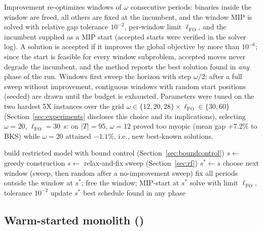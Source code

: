 Improvement re-optimizes windows of $\omega$ consecutive periods:
binaries inside the window are freed, all others are fixed at the
incumbent, and the window MIP is solved with relative gap tolerance
$10^{-2}$, per-window limit $\ell_{\mathrm{FO}}$, and the incumbent
supplied as a MIP start (accepted starts were verified in the solver
log). A solution is accepted if it improves the global objective by
more than $10^{-6}$; since the start is feasible for every window
subproblem, accepted moves never degrade the incumbent, and the
method reports the best solution found in \emph{any} phase of the
run. Windows first sweep the horizon with step $\omega/2$; after a
full sweep without improvement, contiguous windows with random start
positions (seeded) are drawn until the budget is exhausted.
Parameters were tuned on the two hardest 5X instances over the grid
$\omega\in\{12,20,28\}\times\ell_{\mathrm{FO}}\in\{30,60\}$
(Section~\ref{sec:experiments} discloses this choice and its
implications), selecting $\omega=20$, $\ell_{\mathrm{FO}}=30$~s: on
$|T|=95$, $\omega=12$ proved too myopic (mean gap $+7.2\%$ to BKS)
while $\omega=20$ attained $-1.1\%$, i.e., new best-known solutions.

\begin{algorithm}[t]
\caption{\RFFO{} (sketch; \RFMIP{} replaces lines 6--9 by one
warm-started solve of the full model)}
\label{alg:rffo}
\begin{algorithmic}[1]
\State build restricted model with bound control
(Section~\ref{sec:boundcontrol})
 $s \gets$ greedy construction
\Else{} $s \gets$ relax-and-fix sweep (Section~\ref{sec:rf})
\EndIf
\State $s^\ast \gets s$
  \State choose next window (sweep, then random after a
  no-improvement sweep)
  \State fix all periods outside the window at $s^\ast$; free the
  window; MIP-start at $s^\ast$
  \State solve with limit $\ell_{\mathrm{FO}}$, tolerance $10^{-2}$
   update $s^\ast$ \EndIf
\EndWhile
\State \Return best schedule found in any phase
\end{algorithmic}
\end{algorithm}

\subsection{Warm-started monolith (\RFMIP)}
\label{sec:rfmip}

